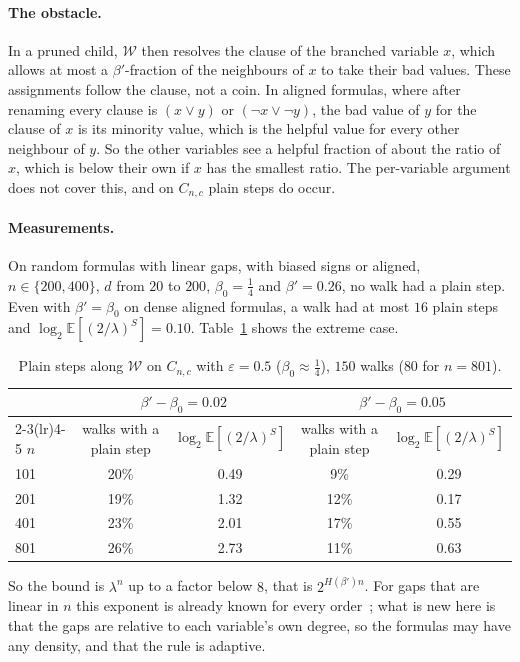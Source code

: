 \documentclass[11pt,a4paper]{article}
\theoremstyle{remark}
\newcommand{\E}{\mathbb{E}}
\newcommand{\W}{\mathcal{W}}
\begin{document}
\paragraph{The obstacle.} In a pruned child, $\W$ then resolves the clause of
the branched variable $x$, which allows at most a $\beta'$-fraction of the
neighbours of $x$ to take their bad values. These assignments follow the
clause, not a coin. In aligned formulas, where after renaming every clause is
$(x\lor y)$ or $(\neg x\lor\neg y)$, the bad value of $y$ for the clause of
$x$ is its minority value, which is the helpful value for every other neighbour
of $y$. So the other variables see a helpful fraction of about the ratio of
$x$, which is below their own if $x$ has the smallest ratio. The per-variable
argument does not cover this, and on $C_{n,c}$ plain steps do occur.

\paragraph{Measurements.} On random formulas with linear gaps, with biased
signs or aligned, $n\in\{200,400\}$, $d$ from $20$ to $200$, $\beta_0=\frac14$
and $\beta'=0.26$, no walk had a plain step. Even with $\beta'=\beta_0$ on dense
aligned formulas, a walk had at most $16$ plain steps and
$\log_2\E[(2/\lambda)^S]=0.10$. Table~\ref{tab:cnc} shows the extreme case.

\begin{table}[ht]
\centering
\begin{tabular}{lcccc}
\toprule
 & \multicolumn{2}{c}{$\beta'-\beta_0=0.02$} &
 \multicolumn{2}{c}{$\beta'-\beta_0=0.05$}\\
\cmidrule(lr){2-3}\cmidrule(lr){4-5}
$n$ & walks with a plain step & $\log_2\E[(2/\lambda)^S]$ &
walks with a plain step & $\log_2\E[(2/\lambda)^S]$\\
\midrule
101 & 20\% & 0.49 & 9\% & 0.29\\
201 & 19\% & 1.32 & 12\% & 0.17\\
401 & 23\% & 2.01 & 17\% & 0.55\\
801 & 26\% & 2.73 & 11\% & 0.63\\
\bottomrule
\end{tabular}
\caption{Plain steps along $\W$ on $C_{n,c}$ with $\varepsilon=0.5$
($\beta_0\approx\frac14$), $150$ walks ($80$ for $n=801$).}
\label{tab:cnc}
\end{table}

So the bound is $\lambda^n$ up to a factor below $8$, that is
$2^{H(\beta')n}$. For gaps that are linear in $n$ this exponent is already
known for every order~\cite[Theorems~11 and~24]{N3}; what is new here is that
the gaps are relative to each variable's own degree, so the formulas may have
any density, and that the rule is adaptive.
\end{document}
